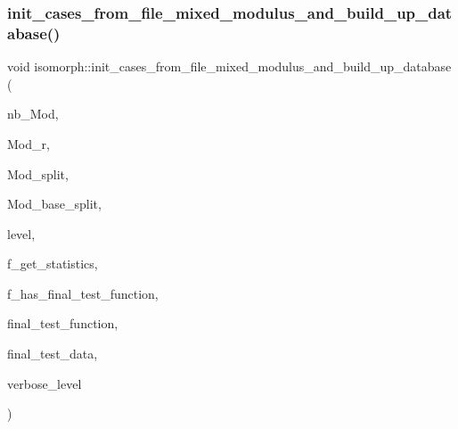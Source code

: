\subsubsection{\texorpdfstring{init\+\_\+cases\+\_\+from\+\_\+file\+\_\+mixed\+\_\+modulus\+\_\+and\+\_\+build\+\_\+up\+\_\+database()}{init\_cases\_from\_file\_mixed\_modulus\_and\_build\_up\_database()}}
{\footnotesize\ttfamily void isomorph\+::init\+\_\+cases\+\_\+from\+\_\+file\+\_\+mixed\+\_\+modulus\+\_\+and\+\_\+build\+\_\+up\+\_\+database (\begin{DoxyParamCaption}\item[{\mbox{\hyperlink{galois_8h_a09fddde158a3a20bd2dcadb609de11dc}{I\+NT}}}]{nb\+\_\+\+Mod,  }\item[{\mbox{\hyperlink{galois_8h_a09fddde158a3a20bd2dcadb609de11dc}{I\+NT}} $\ast$}]{Mod\+\_\+r,  }\item[{\mbox{\hyperlink{galois_8h_a09fddde158a3a20bd2dcadb609de11dc}{I\+NT}} $\ast$}]{Mod\+\_\+split,  }\item[{\mbox{\hyperlink{galois_8h_a09fddde158a3a20bd2dcadb609de11dc}{I\+NT}} $\ast$}]{Mod\+\_\+base\+\_\+split,  }\item[{\mbox{\hyperlink{galois_8h_a09fddde158a3a20bd2dcadb609de11dc}{I\+NT}}}]{level,  }\item[{\mbox{\hyperlink{galois_8h_a09fddde158a3a20bd2dcadb609de11dc}{I\+NT}}}]{f\+\_\+get\+\_\+statistics,  }\item[{\mbox{\hyperlink{galois_8h_a09fddde158a3a20bd2dcadb609de11dc}{I\+NT}}}]{f\+\_\+has\+\_\+final\+\_\+test\+\_\+function,  }\item[{\mbox{\hyperlink{galois_8h_a09fddde158a3a20bd2dcadb609de11dc}{I\+NT}}($\ast$)(\mbox{\hyperlink{galois_8h_a09fddde158a3a20bd2dcadb609de11dc}{I\+NT}} $\ast$data, \mbox{\hyperlink{galois_8h_a09fddde158a3a20bd2dcadb609de11dc}{I\+NT}} sz, void $\ast$final\+\_\+test\+\_\+data, \mbox{\hyperlink{galois_8h_a09fddde158a3a20bd2dcadb609de11dc}{I\+NT}} \mbox{\hyperlink{simeon_8_c_a818073fbcc2f439e7c56952f67386122}{verbose\+\_\+level}})}]{final\+\_\+test\+\_\+function,  }\item[{void $\ast$}]{final\+\_\+test\+\_\+data,  }\item[{\mbox{\hyperlink{galois_8h_a09fddde158a3a20bd2dcadb609de11dc}{I\+NT}}}]{verbose\+\_\+level }\end{DoxyParamCaption})}

\mbox{\label{classisomorph_a42c6ebeadb51263d8ae8c1bdaae3ebbd}} 
